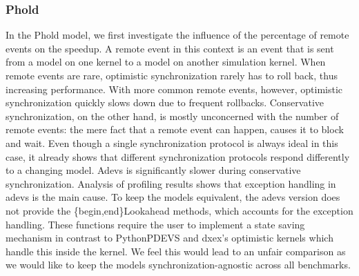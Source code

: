 \subsubsection{Phold}
In the Phold model, we first investigate the influence of the percentage of remote events on the speedup. A remote event in this context is an event that is sent from a model on one kernel to a model on another simulation kernel.
When remote events are rare, optimistic synchronization rarely has to roll back, thus increasing performance.
With more common remote events, however, optimistic synchronization quickly slows down due to frequent rollbacks.
Conservative synchronization, on the other hand, is mostly unconcerned with the number of remote events: the mere fact that a remote event can happen, causes it to block and wait.
Even though a single synchronization protocol is always ideal in this case, it already shows that different synchronization protocols respond differently to a changing model.
Adevs is significantly slower during conservative synchronization.
Analysis of profiling results shows that exception handling in adevs is the main cause. 
To keep the models equivalent, the adevs version does not provide the \{begin,end\}Lookahead methods, which accounts for the exception handling. These functions require the user to implement a state saving mechanism in contrast to PythonPDEVS and dxex's optimistic kernels which handle this inside the kernel. We feel this would lead to an unfair comparison as we would like to keep the models synchronization-agnostic across all benchmarks.

